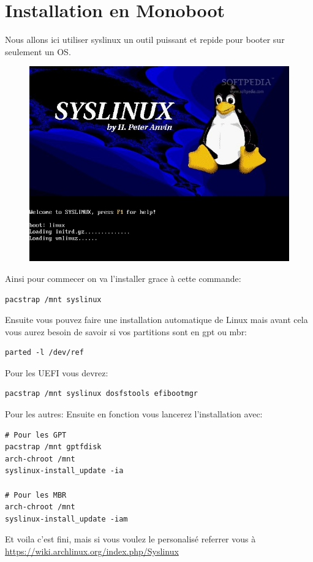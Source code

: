 \documentclass[a4paper]{book}
\begin{document}
\section{Installation en Monoboot}
Nous allons ici utiliser syslinux un outil puissant et repide pour booter sur
seulement un OS.
\begin{figure}[h]
  \includegraphics[width=\textwidth]{images/syslinux}
\end{figure}
Ainsi pour commecer on va l'installer grace à cette commande\@:\\
\begin{lstlisting}
pacstrap /mnt syslinux
\end{lstlisting}
Ensuite vous pouvez faire une installation automatique de Linux mais avant cela
vous aurez besoin de savoir si vos partitions sont en gpt ou mbr\@:\\
\begin{lstlisting}
parted -l /dev/ref
\end{lstlisting}
Pour les UEFI vous devrez:
\begin{lstlisting}
pacstrap /mnt syslinux dosfstools efibootmgr
\end{lstlisting}
Pour les autres\@:
Ensuite en fonction vous lancerez l'installation avec\@:\\
\begin{lstlisting}
# Pour les GPT
pacstrap /mnt gptfdisk
arch-chroot /mnt
syslinux-install_update -ia

# Pour les MBR
arch-chroot /mnt
syslinux-install_update -iam
\end{lstlisting}
Et voila c'est fini, mais si vous voulez le personalis\'e referrer vous à\\
\url{https://wiki.archlinux.org/index.php/Syslinux}
\end{document}
